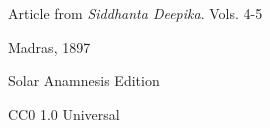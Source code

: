 \documentclass[a4paper, 12pt, oneside, english]{article}
\begin{document}
\begin{titlepage}
	

        {Article from \emph{Siddhanta Deepika}. Vols. 4-5}
        
	\vspace*{0.5\baselineskip} %
	
	Madras, 1897 %
	
	\vspace{0.5\baselineskip} %

    {\small Solar Anamnesis Edition} %
	
	{\small CC0 1.0 Universal } %
\end{titlepage}
\setlength{\parskip}{1mm plus1mm minus1mm}
\setcounter{tocdepth}{3}
\setcounter{secnumdepth}{3}
\clearpage
\large
\end{document}
